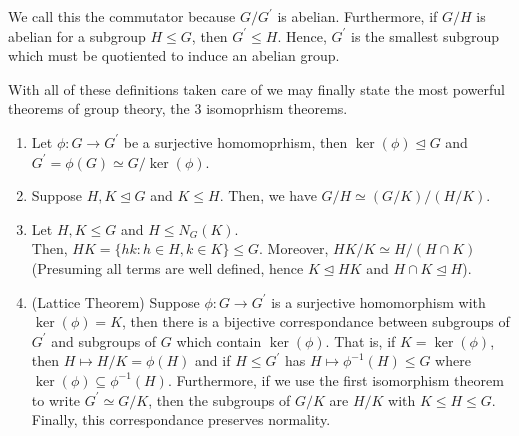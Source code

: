 \begin{remark}
	We call this the commutator because $G / G ^{\prime}$ is abelian. Furthermore, if $G / H$ is abelian for a subgroup $H \le G$, then $G^{\prime}\le H$. Hence, $G^{\prime}$ is the smallest subgroup which must be quotiented to induce an abelian group.
\end{remark}
With all of these definitions taken care of we may finally state the most powerful theorems of group theory, the $3$ isomoprhism theorems.
\begin{theorem}
	\begin{enumerate}
		\item Let $ \phi: G \to G^{\prime}$ be a surjective homomoprhism, then $\ker \left( \phi \right) \trianglelefteq G$ and $G^{\prime}= \phi \left( G \right) \simeq G / \ker \left( \phi \right) $.
		\item Suppose $H, K \trianglelefteq G$ and $K \le H$. Then, we have $G / H \simeq \left( G / K \right) / \left( H / K \right) $.
		\item Let $H, K \le G$ and $H \le N_{G}\left( K \right) $. \\Then, $HK = \{hk: h \in H, k \in K\} \le G$. Moreover, $HK / K \simeq H / \left( H \cap K \right) $ (Presuming all terms are well defined, hence $K \trianglelefteq HK$ and $H \cap K \trianglelefteq H$).
		\item (Lattice Theorem) Suppose $ \phi: G \to G^{\prime}$ is a surjective homomorphism with \(\ker \left( \phi \right) = K\), then there is a bijective correspondance between subgroups of $G^{\prime}$ and subgroups of $G$ which contain $\ker \left( \phi \right) $. That is, if $K = \ker\left( \phi \right)$, then $H \mapsto H / K = \phi \left( H \right) $ and if $H \le G^{\prime}$ has $H \mapsto \phi^{-1} \left( H \right) \le G$ where $\ker\left( \phi \right) \subseteq \phi^{-1}\left( H \right) $. Furthermore, if we use  the first isomorphism theorem to write $G^{\prime} \simeq G / K$, then the subgroups of $G / K$ are $H / K$ with $K \le H \le G$. Finally, this correspondance preserves normality.
	\end{enumerate}
\end{theorem}
